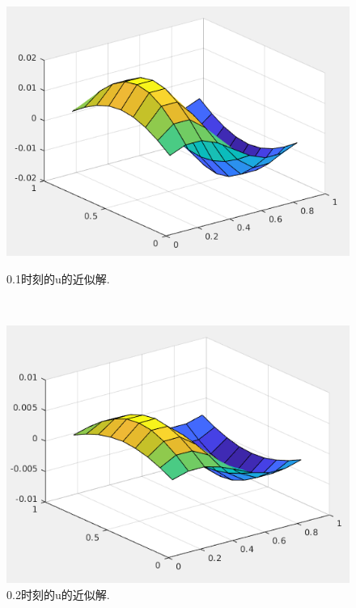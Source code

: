 \documentclass[12pt,a4paper]{article}
\begin{document}
\begin{figure}[ht]
	\begin{minipage}[t]{0.4\linewidth}%
		\centering     %
		\includegraphics[width=1.2\textwidth]{./figures/time1.png}
		\caption{0.1时刻的u的近似解.}%
		\label{fig:liuchengtu1}%
	\end{minipage} 
	\hfill
	\begin{minipage}[t]{0.4\linewidth}
		\centering
		\includegraphics[width=1.2\textwidth]{./figures/time2.png}
		\caption{0.2时刻的u的近似解.}%
		\label{fig:liuchengtu2}
	\end{minipage}
\end{figure}
\end{document}
